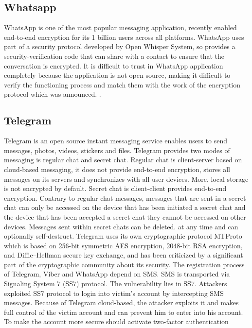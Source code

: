\subsection{Whatsapp}
WhatsApp is one of the most popular messaging application, recently
enabled end-to-end encryption for its 1 billion users across all platforms.
WhatsApp uses part of a security protocol developed by Open Whisper System,
so provides a security-verification code that can share with a contact to
ensure
that the conversation is encrypted. It is difficult to trust in
WhatsApp application completely because the application is not open source,
making it difficult to verify the functioning process and match them
with the work of the encryption protocol which was announced. .\cite{Sabah2017}

\subsection{Telegram}
Telegram is an open source instant messaging service enables users
to send messages, photos, videos, stickers and files. Telegram provides
two modes of messaging
is regular chat and secret chat. Regular chat is client-server based on
cloud-based messaging, it does not provide end-to-end encryption, stores
all messages on its
servers and synchronizes with all user devices. More, local storage is
not encrypted by default. Secret chat is client-client provides end-to-end
encryption. Contrary to regular chat messages, messages that are sent in a
secret chat can only be accessed on the device that has been initiated a
secret chat and the device that has been accepted a secret chat they
cannot be accessed on other devices. Messages sent within secret chats
can be deleted.
at any time and can optionally self-destruct. Telegram uses its
own cryptographic protocol MTProto which is based on 256-bit symmetric
AES encryption, 2048-bit RSA encryption, and Diffie–Hellman secure key
exchange, and has been criticized by a significant part of the cryptographic
community about its security. The registration process of Telegram, Viber
and WhatsApp depend on SMS. SMS is transported via Signaling System 7 (SS7)
protocol. The vulnerability lies in SS7. Attackers exploited SS7 protocol
to login into
victim's account by intercepting SMS messages. Because of Telegram cloud-based,
the attacker exploits it and makes full control of the victim account and can
prevent him to enter into his account. To make the account more secure should
activate two-factor authentication \cite{Sabah2017}

